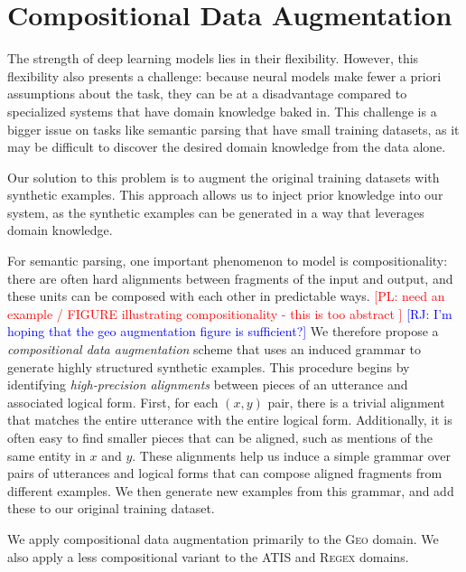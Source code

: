 \documentclass[11pt,letterpaper]{article}
\newcommand{\atis}{\textsc{ATIS}\xspace}
\newcommand{\regex}{\textsc{Regex}\xspace}
\newcommand{\geo}{\textsc{Geo}\xspace}
\newcommand\pl[1]{\textcolor{red}{[PL: #1]}}
\newcommand\rj[1]{\textcolor{blue}{[RJ: #1]}}
\begin{document}
\section{Compositional Data Augmentation}
The strength of deep learning models lies in their flexibility.
However, this flexibility also presents a challenge:
because neural models make fewer a priori assumptions about the task,
they can be at a disadvantage compared to specialized systems
that have domain knowledge baked in.
This challenge is a bigger issue on tasks like semantic parsing
that have small training datasets, as
it may be difficult to discover the desired domain knowledge
from the data alone.

Our solution to this problem is to
augment the original training datasets with synthetic examples.
This approach allows us to inject prior knowledge into our system,
as the synthetic examples can be generated 
in a way that leverages domain knowledge.

For semantic parsing, one important phenomenon to model is compositionality:
there are often hard alignments between fragments
of the input and output, and these units can be composed
with each other in predictable ways.
\pl{need an example / FIGURE illustrating compositionality - this is too abstract }
\rj{I'm hoping that the geo augmentation figure is sufficient?}
We therefore propose a \emph{compositional data augmentation} scheme
that uses an induced grammar to generate highly structured synthetic examples.
This procedure begins by identifying \emph{high-precision alignments}
between pieces of an utterance and associated logical form.
First, for each $(x, y)$ pair, there is a trivial alignment that
matches the entire utterance with the entire logical form.
Additionally, it is often easy to find smaller pieces that can be aligned,
such as mentions of the same entity in $x$ and $y$.
These alignments help us
induce a simple grammar over pairs of utterances and logical forms
that can compose aligned fragments from different examples.
We then generate new examples from this grammar,
and add these to our original training dataset.

We apply compositional data augmentation primarily to the \geo domain.
We also apply a less compositional variant to the
\atis and \regex domains.
\end{document}
